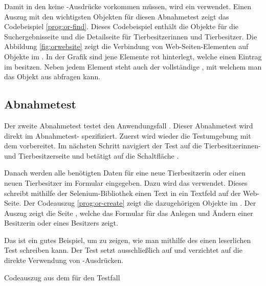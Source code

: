 \SuperPar
Damit in den  keine -Ausdrücke vorkommen müssen, wird ein  verwendet. Einen Auszug mit den wichtigsten Objekten für diesen Abnahmetest zeigt das Codebeispiel \ref{prog:or-find}. Dieses Codebeispiel enthält die Objekte für die Suchergebnisseite und die Detailseite für Tierbesitzerinnen und Tierbesitzer. Die Abbildung \ref{fig:orwebsite} zeigt die Verbindung von Web-Seiten-Elementen auf Objekte im . In der Grafik sind jene Elemente rot hinterlegt, welche einen Eintrag im  besitzen. Neben jedem Element steht auch der vollständige , mit welchem man das Objekt aus  abfragen kann.


\subsection{Abnahmetest }
\label{cha:TestenUA2}


Der zweite Abnahmetest testet den Anwendungsfall . Dieser Abnahmetest wird direkt im Abnahmetest- spezifiziert. Zuerst wird wieder die Testumgebung mit dem   vorbereitet. Im nächsten Schritt navigiert der Test auf die Tierbesitzerinnen- und Tierbesitzerseite und betätigt auf die Schaltfläche . 


\SuperPar
Danach werden alle benötigten Daten für eine neue Tierbesitzerin oder einen neuen Tierbesitzer im Formular eingegeben. Dazu wird das   verwendet. Dieses  schreibt mithilfe der Selenium-Bibliothek einen Text in ein Textfeld auf der Web-Seite. Der Codeauszug \ref{prog:or-create} zeigt die dazugehörigen Objekte im . Der Auszug zeigt die Seite , welche das Formular für das Anlegen und Ändern einer Besitzerin oder eines Besitzers zeigt.

\SuperPar
Das   ist ein gutes Beispiel, um zu zeigen, wie man mithilfe des  einen leserlichen Test schreiben kann. Der Test setzt ausschließlich auf   und verzichtet auf die direkte Verwendung von -Ausdrücken. 

\begin{program}

\caption{Codeauszug aus dem  für den Testfall }
\label{prog:or-create}
\end{program}

